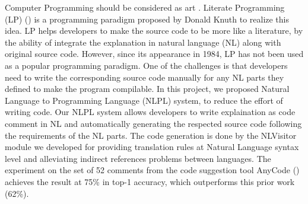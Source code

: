 
Computer Programming should be considered as art . Literate Programming (LP) (\cite{Knuth:1984:LP:473.479})  is a programming paradigm proposed by Donald Knuth
to realize this idea. LP helps developers to make the source code to be more like a literature, by the ability of 
integrate the explanation in natural language (NL) along with original source code. However, since its appearance in 1984, 
LP has not been used as a popular programming paradigm. One of the challenges is that developers need to write 
the corresponding source code manually for any NL parts they defined to make the program compilable. 
In this project, we proposed Natural Language to Programming
Language (NLPL) system, to reduce the effort of writing code. 
Our NLPL system allows developers to write explaination as code comment in NL and automatically
generating the respected source code following the requirements of the NL parts. The code generation is done by the NLVisitor module we developed
for providing translation rules at Natural Language syntax level and alleviating indirect references problems between languages.
The experiment on the set of 52 comments from the code suggestion tool AnyCode (\cite{Gvero:2015:SJE:2814270.2814295}) achieves the result at 75\% in top-1 accuracy, 
which outperforms this prior work (62\%).  